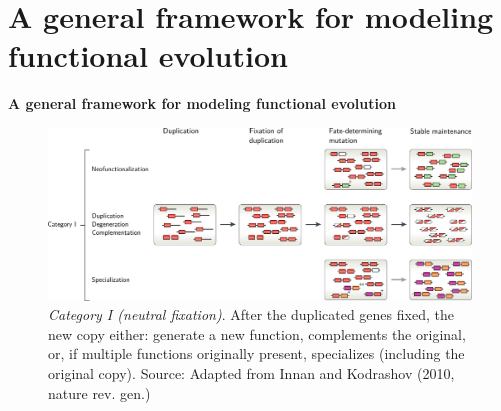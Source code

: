 \documentclass[aspectratio=169, 9pt]{beamer}
\begin{document}
\section{A general framework for modeling functional evolution}

\begin{frame}[t]
	\textcolor{uscgold}{
		\Large {\bf A general framework for modeling functional evolution} 
	}
\end{frame}


\begin{frame}[t,label=inno-cat1]
	\begin{figure}
		\includegraphics[width=1\linewidth]{innan-kodrashov-category-i.pdf}
		\caption{\textit{Category I (neutral fixation)}. After the duplicated genes fixed, the new copy either: generate a new function, complements the original, or, if multiple functions originally present, specializes (including the original copy). {\footnotesize Source: Adapted from Innan and Kodrashov (2010, nature rev. gen.)}}
	\end{figure}
	\vfill\hfill%
\end{frame}
\end{document}
